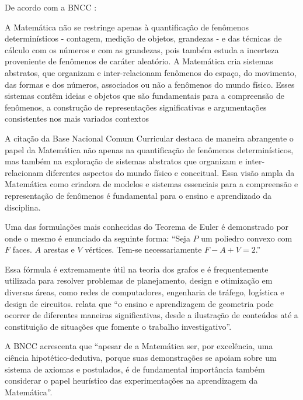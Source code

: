 De acordo com a BNCC \cite[p. 265]{Educacao2018}:

\begin{citacao}
    A Matemática não se restringe apenas à quantificação de fenômenos determinísticos - contagem, medição de objetos, grandezas - e das técnicas de cálculo com os números e com as grandezas, pois também estuda a incerteza proveniente de fenômenos de caráter aleatório. A Matemática cria sistemas abstratos, que organizam e inter-relacionam fenômenos do espaço, do movimento, das formas e dos números, associados ou não a fenômenos do mundo físico. Esses sistemas contêm ideias e objetos que são fundamentais para a compreensão de fenômenos, a construção de representações significativas e argumentações consistentes nos mais variados contextos \cite[p. 265]{Educacao2018}
\end{citacao}

A citação da Base Nacional Comum Curricular destaca de maneira abrangente o papel da Matemática não apenas na quantificação de fenômenos determinísticos, mas também na exploração de sistemas abstratos que organizam e inter-relacionam diferentes aspectos do mundo físico e conceitual. Essa visão ampla da Matemática como criadora de modelos e sistemas essenciais para a compreensão e representação de fenômenos é fundamental para o ensino e aprendizado da disciplina.

Uma das formulações mais conhecidas do Teorema de Euler é demonstrado por  onde o mesmo é enunciado da seguinte forma: ``Seja $P$ um poliedro convexo com $F$ faces. $A$ arestas e $V$ vértices. Tem-se necessariamente \textcolor[HTML]{0000FF}{$F - A + V = 2$}.''

Essa fórmula é extremamente útil na teoria dos grafos e é frequentemente utilizada para resolver problemas de planejamento, design e otimização em diversas áreas, como redes de computadores, engenharia de tráfego, logística e design de circuitos.  relata que ``o ensino e aprendizagem de geometria pode ocorrer de diferentes maneiras significativas, desde a ilustração de conteúdos até a constituição de situações que fomente o trabalho investigativo''.

A BNCC \cite[p. 265]{Educacao2018} acrescenta que ``apesar de a Matemática ser, por excelência, uma ciência hipotético-dedutiva, porque suas demonstrações se apoiam sobre um sistema de axiomas e postulados, é de fundamental importância também considerar o papel heurístico das experimentações na aprendizagem da Matemática''.

